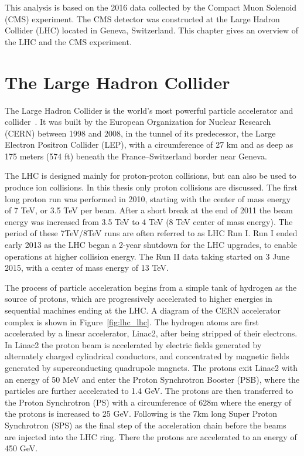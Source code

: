 
This analysis is based on the 2016 data collected by the Compact Muon Solenoid (CMS) experiment. The CMS detector was constructed at the Large Hadron Collider (LHC) located in Geneva, Switzerland. This chapter gives an overview of the LHC and the CMS experiment.

\section{The Large Hadron Collider} 
The Large Hadron Collider is the world's most powerful particle accelerator and collider~\cite{lhc_lhcmachine,lhc_lhcreport}. It was built by the European Organization for Nuclear Research (CERN) between 1998 and 2008, in the tunnel of its predecessor, the Large Electron Positron Collider (LEP), with a circumference of 27 km and as deep as 175 meters (574 ft) beneath the France–Switzerland border near Geneva. 

\vspace{0.3cm}
The LHC is designed mainly for proton-proton collisions, but can also be used to produce ion collisions. In this thesis only proton collisions are discussed. The first long proton run was performed in 2010, starting with the center of mass energy of 7 TeV, or 3.5 TeV per beam. After a short break at the end of 2011 the beam energy was increased from 3.5 TeV to 4 TeV (8 TeV center of mass energy). The period of these 7TeV/8TeV runs are often referred to as LHC Run I. Run I ended early 2013 as the LHC began a 2-year shutdown for the LHC upgrades, to enable operations at higher collision energy. The Run II data taking started on 3 June 2015, with a center of mass energy of 13 TeV. 

\vspace{0.3cm}
The process of particle acceleration begins from a simple tank of hydrogen as the source of protons, which are progressively accelerated to higher energies in sequential machines ending at the LHC. A diagram of the CERN accelerator complex is shown in Figure~\ref{fig:lhc_lhc}. The hydrogen atoms are first accelerated by a linear accelerator, Linac2, after being stripped of their electrons. In Linac2 the proton beam is accelerated by electric fields generated by alternately charged cylindrical conductors, and concentrated by magnetic fields generated by superconducting quadrupole magnets. The protons exit Linac2 with an energy of 50 MeV and enter the Proton Synchrotron Booster (PSB), where the particles are further accelerated to 1.4 GeV. The protons are then transferred to the Proton Synchrotron (PS) with a circumference of 628m where the energy of the protons is increased to 25 GeV. Following is the 7km long Super Proton Synchrotron (SPS) as the final step of the acceleration chain before the beams are injected into the LHC ring. There the protons are accelerated to an energy of 450 GeV.

